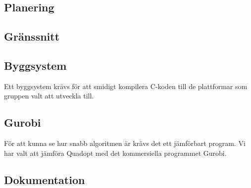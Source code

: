 \subsection{Planering}
\begin{LIPSaktivitetslista}
\end{LIPSaktivitetslista}

\subsection{Gränssnitt}

\begin{LIPSaktivitetslista}
\end{LIPSaktivitetslista}

\subsection{Byggsystem}
Ett byggsystem krävs för att smidigt kompilera C-koden till de plattformar som gruppen valt att utveckla till.
\begin{LIPSaktivitetslista}
\end{LIPSaktivitetslista}

\subsection{Gurobi}
För att kunna se hur snabb algoritmen är krävs det ett jämförbart program. Vi har valt att jämföra Quadopt med det kommersiella programmet Gurobi.
\begin{LIPSaktivitetslista}
\end{LIPSaktivitetslista}

\subsection{Dokumentation}
\begin{LIPSaktivitetslista}
\end{LIPSaktivitetslista}
